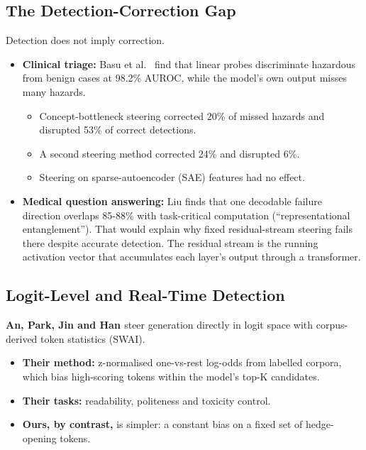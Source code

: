 \documentclass[11pt,letterpaper]{article}
\providecommand{\tightlist}{\setlength{\itemsep}{0pt}\setlength{\parskip}{0pt}}
\DeclareRobustCommand{\_}{\textunderscore\allowbreak}
\begin{document}
\hypertarget{the-detection-correction-gap}{%
\subsection{The Detection-Correction Gap}\label{the-detection-correction-gap}}

Detection does not imply correction.

\begin{itemize}
\tightlist
\item
  \textbf{Clinical triage:} Basu et al.~\cite{basu2026interpretability} find that linear probes discriminate hazardous from benign cases at 98.2\% AUROC, while the model's own output misses many hazards.

  \begin{itemize}
  \tightlist
  \item
    Concept-bottleneck steering corrected 20\% of missed hazards and disrupted 53\% of correct detections.
  \item
    A second steering method corrected 24\% and disrupted 6\%.
  \item
    Steering on sparse-autoencoder (SAE) features had no effect.
  \end{itemize}
\item
  \textbf{Medical question answering:} Liu \cite{liu2026decodable} finds that one decodable failure direction overlaps 85-88\% with task-critical computation (``representational entanglement''). That would explain why fixed residual-stream steering fails there despite accurate detection. The residual stream is the running activation vector that accumulates each layer's output through a transformer.
\end{itemize}

\hypertarget{logit-level-and-real-time-detection}{%
\subsection{Logit-Level and Real-Time Detection}\label{logit-level-and-real-time-detection}}

\textbf{An, Park, Jin and Han \cite{an2026steering}} steer generation directly in logit space with corpus-derived token statistics (SWAI).

\begin{itemize}
\tightlist
\item
  \textbf{Their method:} z-normalised one-vs-rest log-odds from labelled corpora, which bias high-scoring tokens within the model's top-K candidates.
\item
  \textbf{Their tasks:} readability, politeness and toxicity control.
\item
  \textbf{Ours, by contrast,} is simpler: a constant bias on a fixed set of hedge-opening tokens.
\end{itemize}
\end{document}
